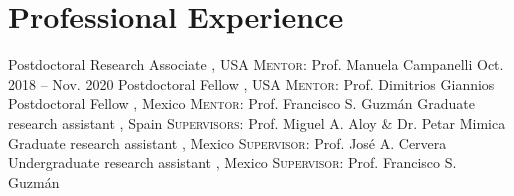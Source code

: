 \section{Professional Experience}

%
{\CCRG}%
{Postdoctoral Research Associate}%
{}%
{\RIT, USA}%
{\textsc{Mentor}: Prof. Manuela Campanelli}
{Oct. 2018 -- Nov. 2020}%
{\DPA}%
{Postdoctoral Fellow}%
{}%
{\Purdue, USA}%
{\textsc{Mentor}: Prof. Dimitrios Giannios}
%
{\IFMes}%
{Postdoctoral Fellow}%
{}%
{\UMSNHes, Mexico}%
{\textsc{Mentor}: Prof. Francisco S. Guzmán}
%
{\DAAval}%
{Graduate research assistant}%
{}%
{\UVval, Spain}%
{\textsc{Supervisors}: Prof. Miguel A. Aloy \& Dr. Petar Mimica}
%
{\IFMes}%
{Graduate research assistant}%
{}%
{\UMSNHes, Mexico}%
{\textsc{Supervisor}: Prof. José A. Cervera}
%
{\FCes}%
{Undergraduate research assistant}%
{}%
{\UAEMes, Mexico}%
{\textsc{Supervisor}: Prof. Francisco S. Guzmán}
